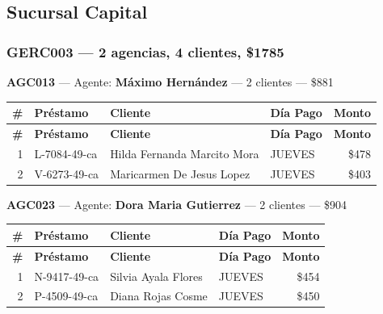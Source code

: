 \documentclass[11pt,a4paper]{article}
\newcommand{\money}[1]{\$\num{#1}}
\begin{document}
\subsection{Sucursal Capital}

\subsubsection{GERC003 --- 2 agencias, 4 clientes, \money{1785}}

\noindent\textbf{AGC013} --- Agente: \textbf{Máximo Hernández} --- 2 clientes --- \money{881}


\begin{center}
\renewcommand{\arraystretch}{1.1}
\footnotesize
\begin{longtable}{rlp{6.5cm}lr}
\toprule
\textbf{\#} & \textbf{Pr\'estamo} & \textbf{Cliente} & \textbf{D\'ia Pago} & \textbf{Monto} \\
\midrule
\endfirsthead
\toprule
\textbf{\#} & \textbf{Pr\'estamo} & \textbf{Cliente} & \textbf{D\'ia Pago} & \textbf{Monto} \\
\midrule
\endhead
1 & L-7084-49-ca & Hilda Fernanda Marcito Mora & JUEVES & \money{478} \\
2 & V-6273-49-ca & Maricarmen De Jesus Lopez & JUEVES & \money{403} \\

\bottomrule
\end{longtable}
\end{center}
\noindent\textbf{AGC023} --- Agente: \textbf{Dora Maria Gutierrez} --- 2 clientes --- \money{904}


\begin{center}
\renewcommand{\arraystretch}{1.1}
\footnotesize
\begin{longtable}{rlp{6.5cm}lr}
\toprule
\textbf{\#} & \textbf{Pr\'estamo} & \textbf{Cliente} & \textbf{D\'ia Pago} & \textbf{Monto} \\
\midrule
\endfirsthead
\toprule
\textbf{\#} & \textbf{Pr\'estamo} & \textbf{Cliente} & \textbf{D\'ia Pago} & \textbf{Monto} \\
\midrule
\endhead
1 & N-9417-49-ca & Silvia Ayala Flores & JUEVES & \money{454} \\
2 & P-4509-49-ca & Diana Rojas Cosme & JUEVES & \money{450} \\

\bottomrule
\end{longtable}
\end{center}
\newpage
\end{document}
